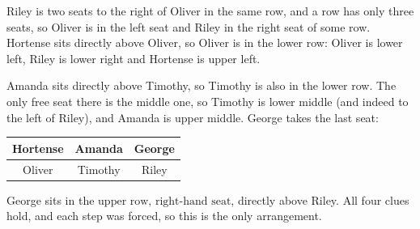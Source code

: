 Riley is two seats to the right of Oliver in the same row, and a row has only three seats, so Oliver is in the left seat and Riley in the right seat of some row. Hortense sits directly above Oliver, so Oliver is in the lower row: Oliver is lower left, Riley is lower right and Hortense is upper left.

Amanda sits directly above Timothy, so Timothy is also in the lower row. The only free seat there is the middle one, so Timothy is lower middle (and indeed to the left of Riley), and Amanda is upper middle. George takes the last seat:
\begin{center}
\begin{tabular}{|c|c|c|}
\hline
Hortense & Amanda & George\\
\hline
Oliver & Timothy & Riley\\
\hline
\end{tabular}
\end{center}
George sits in the $\boxed{\text{upper row, right-hand seat}}$, directly above Riley. All four clues hold, and each step was forced, so this is the only arrangement.
